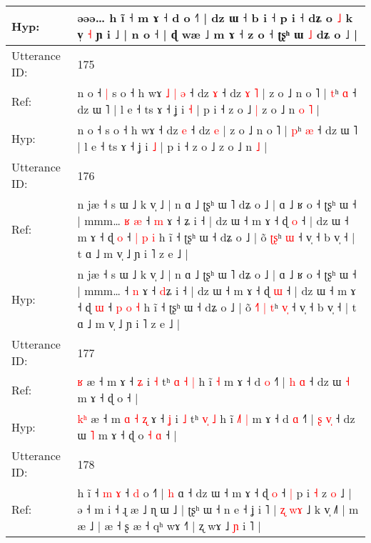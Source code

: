 \documentclass[10pt]{article}
\DeclareRobustCommand{\hl}[1]{{\textcolor{red}{#1}}}
\begin{document}
\begin{longtable}{ll}
 \\
Hyp: & əəə… h ĩ ˧ m ɤ ˧ d o ˧˥ | dz ɯ ˧ b i ˧ p\hl{}\hl{}\hl{}\hl{}\hl{}\hl{} i\hl{} ˧\hl{}\hl{} dʑ o \hl{˩} k v̩ \hl{˧} ɲ i ˩ | n o ˧ | ɖ wæ ˩ m ɤ ˧ z o ˧ ʈʂʰ ɯ \hl{˩} dʑ o ˩ |
 \\
\midrule
Utterance ID: & 175 \\
Ref: & n o ˧\hl{ }\hl{|} s o ˧ h wɤ\hl{ }\hl{˩}\hl{ }\hl{|}\hl{ }\hl{ə} ˧ dz \hl{ɤ} ˧ dz\hl{ }\hl{ɤ} \hl{˥} | z o ˩ n o ˥ | \hl{t}ʰ \hl{ɑ} ˧ dz ɯ ˥ | l e ˧ ts ɤ ˧ ʝ i \hl{˧} | p i ˧ z o ˩\hl{ }\hl{|} z o ˩ n\hl{ }\hl{o} \hl{˥} |
 \\
Hyp: & n o ˧\hl{}\hl{} s o ˧ h wɤ\hl{}\hl{}\hl{}\hl{}\hl{}\hl{} ˧ dz \hl{e} ˧ dz\hl{}\hl{} \hl{e} | z o ˩ n o ˥ | \hl{p}ʰ \hl{æ} ˧ dz ɯ ˥ | l e ˧ ts ɤ ˧ ʝ i \hl{˩} | p i ˧ z o ˩\hl{}\hl{} z o ˩ n\hl{}\hl{} \hl{˩} |
 \\
\midrule
Utterance ID: & 176 \\
Ref: & n jæ ˧ s ɯ ˩ k v̩ ˩ | n ɑ ˩ ʈʂʰ ɯ ˥ dʑ o ˩ | ɑ ˩ ʁ o ˧ ʈʂʰ ɯ ˧ | mmm…\hl{ }\hl{ʁ}\hl{ }\hl{æ} ˧ \hl{m} ɤ ˧ \hl{}ʑ i ˧ | dz ɯ ˧ m ɤ ˧ ɖ \hl{o} ˧ | dz ɯ ˧ m ɤ ˧ ɖ \hl{o} ˧ \hl{|} \hl{p} \hl{i} h ĩ ˧ ʈʂʰ ɯ ˧ dʑ o ˩ | õ\hl{}\hl{}\hl{} \hl{}\hl{ʈ}\hl{ʂ}ʰ \hl{}\hl{ɯ} ˧ v̩ ˧ b v̩ ˧ | t ɑ ˩ m v̩ ˩ ɲ i ˥ z e ˩ |
 \\
Hyp: & n jæ ˧ s ɯ ˩ k v̩ ˩ | n ɑ ˩ ʈʂʰ ɯ ˥ dʑ o ˩ | ɑ ˩ ʁ o ˧ ʈʂʰ ɯ ˧ | mmm…\hl{}\hl{}\hl{}\hl{} ˧ \hl{n} ɤ ˧ \hl{d}ʑ i ˧ | dz ɯ ˧ m ɤ ˧ ɖ \hl{ɯ} ˧ | dz ɯ ˧ m ɤ ˧ ɖ \hl{ɯ} ˧ \hl{p} \hl{o} \hl{˧} h ĩ ˧ ʈʂʰ ɯ ˧ dʑ o ˩ | õ\hl{ }\hl{˧}\hl{˥} \hl{|}\hl{ }\hl{t}ʰ \hl{v}\hl{̩} ˧ v̩ ˧ b v̩ ˧ | t ɑ ˩ m v̩ ˩ ɲ i ˥ z e ˩ |
 \\
\midrule
Utterance ID: & 177 \\
Ref: & \hl{}\hl{ʁ} æ ˧ m\hl{}\hl{}\hl{}\hl{}\hl{}\hl{} ɤ ˧ \hl{ʑ} i \hl{˧} tʰ \hl{ɑ}\hl{ }\hl{˧} \hl{|} h ĩ\hl{}\hl{}\hl{} \hl{˧} m ɤ ˧ d \hl{o} ˧˥ | \hl{h} \hl{}\hl{ɑ} ˧ dz ɯ \hl{˧} m ɤ ˧ ɖ o\hl{}\hl{}\hl{}\hl{} ˧ |
 \\
Hyp: & \hl{k}\hl{ʰ} æ ˧ m\hl{ }\hl{ɑ}\hl{ }\hl{˧}\hl{ }\hl{ʐ} ɤ ˧ \hl{ʝ} i \hl{˩} tʰ \hl{}\hl{v}\hl{̩} \hl{˩} h ĩ\hl{ }\hl{˩}\hl{˥} \hl{|} m ɤ ˧ d \hl{ɑ} ˧˥ | \hl{ʂ} \hl{v}\hl{̩} ˧ dz ɯ \hl{˥} m ɤ ˧ ɖ o\hl{ }\hl{˧}\hl{ }\hl{ɑ} ˧ |
 \\
\midrule
Utterance ID: & 178 \\
Ref: & h ĩ ˧\hl{}\hl{} \hl{m} \hl{ɤ} ˧ \hl{d} o ˧\hl{˥} | \hl{}\hl{h} ɑ ˧ dz ɯ ˧ m ɤ ˧ ɖ \hl{o} ˧\hl{ }\hl{|} p i \hl{˧} z \hl{o} ˩ | ə ˧ m i ˧ ɻ æ ˩ ɳ ɯ ˩ | ʈʂʰ ɯ ˧ n e ˧ ʝ i ˥ | \hl{ʐ} \hl{w}\hl{ɤ} ˩ k v̩ ˩˥ | m æ ˩ | æ ˧ ʂ æ ˧ qʰ wɤ ˧\hl{˥} | ʐ wɤ ˩ \hl{ɲ} i ˥ |

\end{longtable}
\end{document}
